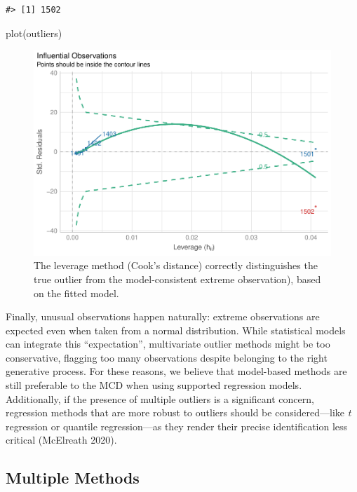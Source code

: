 \documentclass{article}
\newenvironment{Shaded}{\begin{snugshade}}{\end{snugshade}}
\newcommand{\FunctionTok}[1]{\textcolor[rgb]{0.00,0.00,0.00}{#1}}
\newcommand{\NormalTok}[1]{#1}
\begin{document}
\begin{verbatim}
#> [1] 1502
\end{verbatim}

\begin{Shaded}
\begin{Highlighting}[]
\FunctionTok{plot}\NormalTok{(outliers)}
\end{Highlighting}
\end{Shaded}

\begin{figure}
\includegraphics[width=1\linewidth]{paper_files/figure-latex/model2-1} \caption{The leverage method (Cook's distance) correctly distinguishes the true outlier from the model-consistent extreme observation), based on the fitted model.}\label{fig:model2}
\end{figure}

Finally, unusual observations happen naturally: extreme observations are
expected even when taken from a normal distribution. While statistical
models can integrate this ``expectation'', multivariate outlier methods
might be too conservative, flagging too many observations despite
belonging to the right generative process. For these reasons, we believe
that model-based methods are still preferable to the MCD when using
supported regression models. Additionally, if the presence of multiple
outliers is a significant concern, regression methods that are more
robust to outliers should be considered---like \emph{t} regression or
quantile regression---as they render their precise identification less
critical (McElreath 2020).

\hypertarget{multiple-methods}{%
\subsection{Multiple Methods}\label{multiple-methods}}
\end{document}
